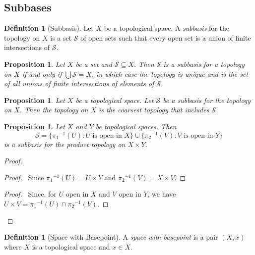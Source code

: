 \documentclass{book}
\let\qed\relax
\newtheorem{prop}[ax]{Proposition}
\theoremstyle{definition}
\newtheorem{df}[ax]{Definition}
\newcommand{\inv}[1]{\ensuremath{{#1}^{-1}}}
\begin{document}
\subsection{Subbases}

\begin{df}[Subbasis]
Let $X$ be a topological space. A \emph{subbasis} for the topology on $X$ is a set $\mathcal{S}$ of open sets such that every open set is a union of finite intersections of $\mathcal{S}$.
\end{df}

\begin{prop}
Let $X$ be a set and $\mathcal{S} \subseteq X$. Then $\mathcal{S}$ is a subbasis for a topology on $X$ if and only if $\bigcup \mathcal{S} = X$, in which case the topology is unique and is the set of all unions of finite intersections of elements of $\mathcal{S}$.
\end{prop}

\begin{prop}
Let $X$ be a topological space.
Let $\mathcal{S}$ be a subbasis for the topology on $X$.
Then the topology on $X$ is the coarsest topology that includes $\mathcal{S}$.
\end{prop}


\begin{prop}
Let $X$ and $Y$ be topological spaces. Then
\[ \mathcal{S} = \{ \inv{\pi_1}(U) : U \text{ is open in } X \} \cup \{ \inv{\pi_2}(V) : V \text{ is open in } Y \} \]
is a subbasis for the product topology on $X \times Y$.
\end{prop}

\begin{proof}
\pf
{}
\begin{proof}
	\pf\ Since $\inv{\pi_1}(U) = U \times Y$ and $\inv{\pi_2}(V) = X \times V$.
\end{proof}
\begin{proof}
	\pf\ Since, for $U$ open in $X$ and $V$ open in $Y$, we have $U \times V = \inv{\pi_1}(U) \cap \inv{\pi_2}(V)$.
\end{proof}
\qed
\end{proof}

\begin{df}[Space with Basepoint]
A \emph{space with basepoint} is a pair $(X,x)$ where $X$ is a topological space and $x \in X$.
\end{df}
\end{document}
